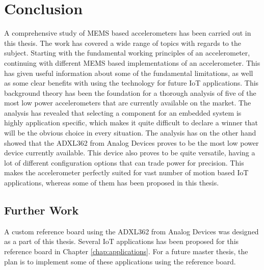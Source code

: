 \chapter{Conclusion}

A comprehensive study of MEMS based accelerometers has been carried out in this thesis. The work has covered a wide range of topics with regards to the subject. Starting with the fundamental working principles of an accelerometer, continuing with different MEMS based implementations of an accelerometer. This has given useful information about some of the fundamental limitations, as well as some clear benefits with using the technology for future IoT applications. This background theory has been the foundation for a thorough analysis of five of the most low power accelerometers that are currently available on the market. The analysis has revealed that selecting a component for an embedded system is highly application specific, which makes it quite difficult to declare a winner that will be the obvious choice in every situation. The analysis has on the other hand showed that the ADXL362 from Analog Devices proves to be the most low power device currently available. This device also proves to be quite versatile, having a lot of different configuration options that can trade power for precision. This makes the accelerometer perfectly suited for vast number of motion based IoT applications, whereas some of them has been proposed in this thesis. 

\section{Further Work}

A custom reference board using the ADXL362 from Analog Devices was designed as a part of this thesis. Several IoT applications has been proposed for this reference board in Chapter \ref{chap:applications}. For a future master thesis, the plan is to implement some of these applications using the reference board. 
